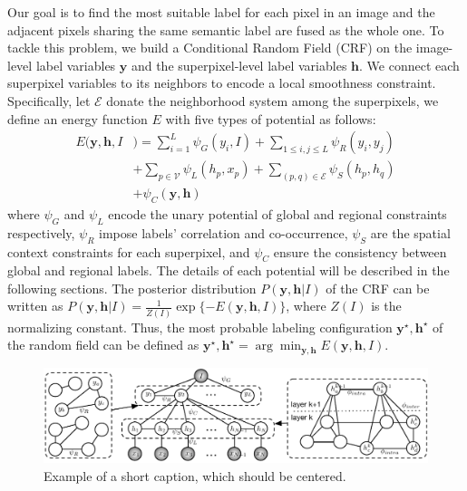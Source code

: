Our goal is to find the most suitable label for each pixel in an image and the adjacent pixels sharing the same semantic label are fused as the whole one. To tackle this problem, we build a Conditional Random Field (CRF) on the image-level label variables $\boldsymbol{y}$ and the superpixel-level label variables $\boldsymbol{h}$. We connect each superpixel variables to its neighbors to encode a local smoothness constraint. Specifically, let $\mathcal{E}$ donate the neighborhood system among the superpixels, we define an energy function $E$ with five types of potential as follows:
\begin{equation}
    \label{eq:energyfunction}
    \begin{aligned}
        E(\boldsymbol{y},\boldsymbol{h},I&) = \sum_{i=1}^L{\psi_{G}(y_i,I)}
                            + \sum_{1 \le i,j \le L} {\psi_{R}(y_i,y_j)}\\ &+ \sum_{p \in \mathcal{V}}{\psi_{L}(h_p,x_p)}+ \sum_{(p,q) \in \mathcal{E}}{\psi_{S}(h_p,h_q)}\\ &+ \psi_{C}(\boldsymbol{y},\boldsymbol{h})
    \end{aligned}
\end{equation}
where $\psi_G$ and $\psi_{L}$ encode the unary potential of global and regional constraints respectively, $\psi_R$ impose labels' correlation and co-occurrence, $\psi_S$ are the spatial context constraints for each superpixel, and $\psi_C$ ensure the consistency between global and regional labels. The details of each potential will be described in the following sections. The posterior distribution $P(\boldsymbol{y},\boldsymbol{h}|I)$ of the CRF can be written as $P(\boldsymbol{y},\boldsymbol{h}|I) = \frac{1}{Z(I)}\exp{\{-E(\boldsymbol{y},\boldsymbol{h},I)\}}$, where $Z(I)$ is the normalizing constant. Thus, the most probable labeling configuration $\boldsymbol{y}^{\star},\boldsymbol{h}^{\star}$ of the random field can be defined as  $\boldsymbol{y}^{\star},\boldsymbol{h}^{\star} = \arg \min_{\boldsymbol{y},\boldsymbol{h}} E(\boldsymbol{y},\boldsymbol{h},I)$.

\begin{figure}
    \begin{center}
        \includegraphics[width=0.95\linewidth]{graphmodel.pdf}
    \end{center}
    \caption{Example of a short caption, which should be centered.}
    \label{fig:graphmodel}
\end{figure}

